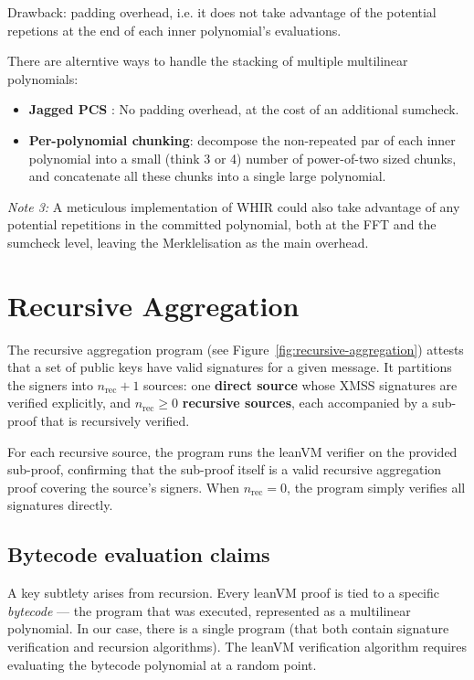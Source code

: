 \documentclass{article}
\theoremstyle{definition}
\begin{document}
Drawback: padding overhead, i.e. it does not take advantage of the potential repetions at the end of each inner polynomial's evaluations.

\vspace{5mm}

There are alterntive ways to handle the stacking of multiple multilinear polynomials:

\begin{itemize}
    \item \textbf{Jagged PCS} \cite{jagged_pcs}: No padding overhead, at the cost of an additional sumcheck.
    \item  \textbf{Per-polynomial chunking}: decompose the non-repeated par of each inner polynomial into a small (think 3 or 4) number of power-of-two sized chunks, and concatenate all these chunks into a single large polynomial.
\end{itemize}

\textit{Note 3:} A meticulous implementation of WHIR could also take advantage of any potential repetitions in the committed polynomial, both at the FFT and the sumcheck level, leaving the Merklelisation as the main overhead.

\section{Recursive Aggregation}\label{sec:recursive-aggregation}

The recursive aggregation program (see Figure~\ref{fig:recursive-aggregation}) attests that a set of public keys have valid signatures for a given message. It partitions the signers into $n_{\text{rec}} + 1$ sources: one \textbf{direct source} whose XMSS signatures are verified explicitly, and $n_{\text{rec}} \geq 0$ \textbf{recursive sources}, each accompanied by a sub-proof that is recursively verified.

For each recursive source, the program runs the leanVM verifier on the provided sub-proof, confirming that the sub-proof itself is a valid recursive aggregation proof covering the source's signers. When $n_{\text{rec}} = 0$, the program simply verifies all signatures directly.

\subsection{Bytecode evaluation claims}\label{sec:bytecode-reduction}

A key subtlety arises from recursion. Every leanVM proof is tied to a specific \emph{bytecode} --- the program that was executed, represented as a multilinear polynomial. In our case, there is a single program (that both contain signature verification and recursion algorithms). The leanVM verification algorithm requires evaluating the bytecode polynomial at a random point.
\end{document}
